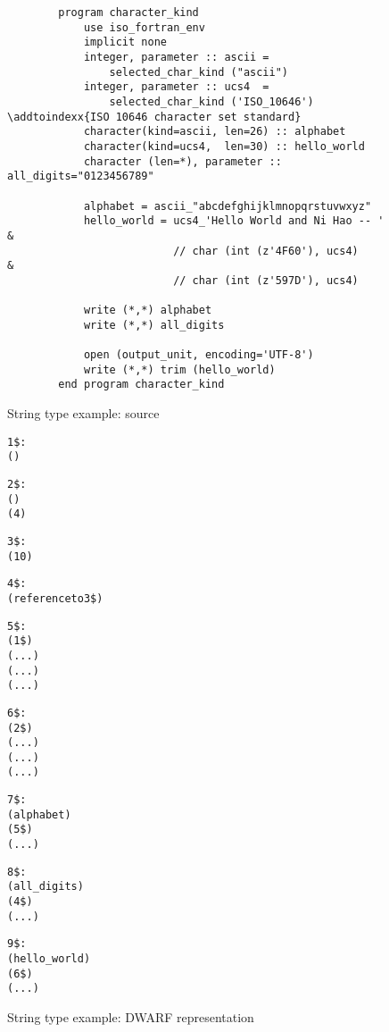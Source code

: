 \begin{figure}[h]
\begin{lstlisting}
        program character_kind
            use iso_fortran_env
            implicit none
            integer, parameter :: ascii = 
                selected_char_kind ("ascii")
            integer, parameter :: ucs4  = 
                selected_char_kind ('ISO_10646')
\addtoindexx{ISO 10646 character set standard}             
            character(kind=ascii, len=26) :: alphabet
            character(kind=ucs4,  len=30) :: hello_world
            character (len=*), parameter :: all_digits="0123456789"
              
            alphabet = ascii_"abcdefghijklmnopqrstuvwxyz"
            hello_world = ucs4_'Hello World and Ni Hao -- ' &
                          // char (int (z'4F60'), ucs4)     &
                          // char (int (z'597D'), ucs4)
              
            write (*,*) alphabet
            write (*,*) all_digits
              
            open (output_unit, encoding='UTF-8')
            write (*,*) trim (hello_world)
        end program character_kind
\end{lstlisting}
\caption{String type example: source}
\label{fig:stringtypeexamplesource}
\end{figure}

\begin{figure}[h]
\begin{dwflisting}
\begin{alltt}

1\$: \DWTAGbasetype
        \DWATencoding (\DWATEASCII)

2\$: \DWTAGbasetype
        \DWATencoding (\DWATEUCS)
        \DWATbytesize (4)

3\$: \DWTAGstringtype
        \DWATbytesize (10)

4\$: \DWTAGconsttype
        \DWATtype (reference to 3\$)
      
5\$: \DWTAGstringtype
        \DWATtype (1\$)
        \DWATstringlength ( ... )
        \DWATstringlengthbytesize ( ... )
        \DWATdatalocation ( ... )
      
6\$: \DWTAGstringtype
        \DWATtype (2\$)
        \DWATstringlength ( ... )
        \DWATstringlengthbytesize ( ... )
        \DWATdatalocation ( ... )

7\$: \DWTAGvariable
        \DWATname (alphabet)
        \DWATtype (5\$)
        \DWATlocation ( ... )

8\$: \DWTAGconstant
        \DWATname (all\_digits)
        \DWATtype (4\$)
        \DWATconstvalue ( ... )

9\$: \DWTAGvariable
        \DWATname (hello\_world)
        \DWATtype (6\$)
        \DWATlocation ( ... )
        
\end{alltt}
\end{dwflisting}
\caption{String type example: DWARF representation}
\label{fig:stringtypeexampledwarf}
\end{figure}

